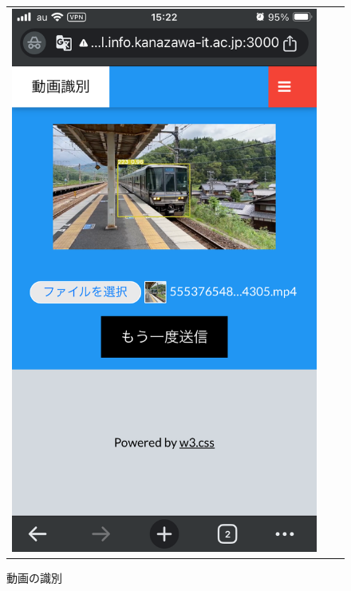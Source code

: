 \begin{figure}[H]
\begin{tabular}{ccc}
\begin{minipage}[b]{0.3\textwidth}
			\includegraphics[width=\linewidth]{chap2/fig/mov_identify1.jpg}
			\caption{動画の識別}
			\label{mov_det}
		\end{minipage}
	\end{tabular}
\end{figure}



